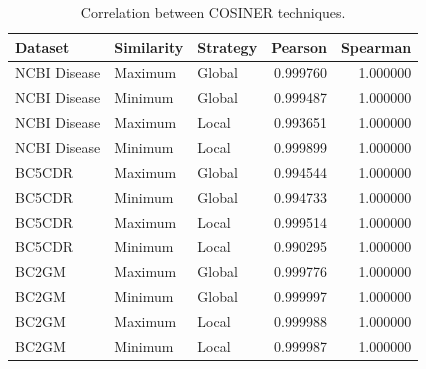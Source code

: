 \begin{table}
    \footnotesize
    \centering
    \caption{Correlation between COSINER techniques.}\begin{tabular}{lllrr}
\toprule
Dataset & Similarity & Strategy & Pearson & Spearman \\
\midrule
NCBI Disease & Maximum & Global & 0.999760 & 1.000000 \\
NCBI Disease & Minimum & Global & 0.999487 & 1.000000 \\
NCBI Disease & Maximum & Local & 0.993651 & 1.000000 \\
NCBI Disease & Minimum & Local & 0.999899 & 1.000000 \\
BC5CDR & Maximum & Global & 0.994544 & 1.000000 \\
BC5CDR & Minimum & Global & 0.994733 & 1.000000 \\
BC5CDR & Maximum & Local & 0.999514 & 1.000000 \\
BC5CDR & Minimum & Local & 0.990295 & 1.000000 \\
BC2GM & Maximum & Global & 0.999776 & 1.000000 \\
BC2GM & Minimum & Global & 0.999997 & 1.000000 \\
BC2GM & Maximum & Local & 0.999988 & 1.000000 \\
BC2GM & Minimum & Local & 0.999987 & 1.000000 \\
\bottomrule
\end{tabular}
\end{table}